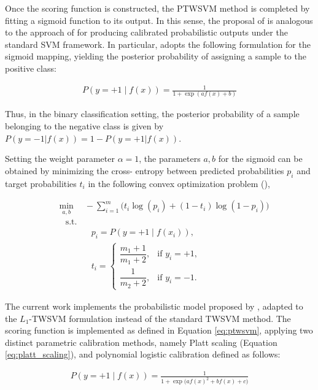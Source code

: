 \documentclass[12pt]{report} %
\begin{document}
\newpage

Once the scoring function is constructed, the PTWSVM method is completed by fitting a sigmoid function to its output. In this sense, the proposal of \cite{shao2012probabilistic} is analogous to the approach of \cite{platt1999probabilistic} for producing calibrated probabilistic outputs under the standard SVM framework. In particular, \cite{shao2012probabilistic} adopts the following formulation for the sigmoid mapping, yielding the posterior probability of assigning a sample to the positive class:

\begin{align}
\label{eq:platt_scaling}
P(y = +1 \mid f(x)) = \frac{1}{1 + \exp(af(x) + b)}
\end{align}

Thus, in the binary classification setting, the posterior probability of a sample belonging to the negative class is given by $P(y = -1| f(x)) = 1 - P(y = +1 | f(x))$.

Setting the weight parameter $\alpha = 1$, the parameters $a, b$ for the sigmoid can be obtained by minimizing the cross- entropy between predicted probabilities $p_i$ and  target probabilities $t_i$ in the following convex optimization problem (\cite{shao2012probabilistic}),


\begin{align}
\label{eq:cross_entropy}
& \min_{a,b} \quad - \sum_{i=1}^m \Big( t_i \log(p_i) + (1-t_i) \log(1-p_i) \Big) \\
& \quad \text{s.t.} \nonumber\\
& \quad \quad \quad \quad p_i = P(y = +1 \mid f(x_i)), \nonumber\\
& \quad \quad \quad \quad t_i = 
    \begin{cases} 
        \dfrac{m_1 + 1}{m_1 + 2}, & \text{if } y_i = +1,\\[1em]
        \dfrac{1}{m_2 + 2}, & \text{if } y_i = -1.
    \nonumber \end{cases}
\end{align}

The current work implements the probabilistic model proposed by \cite{shao2012probabilistic}, adapted to the $L_1$-TWSVM formulation instead of the standard TWSVM method. The scoring function is implemented as defined in Equation \ref{eq:ptwsvm}, applying two distinct parametric calibration methods, namely Platt scaling (Equation \ref{eq:platt_scaling}), and polynomial logistic calibration defined as follows:

\begin{align}
\label{eq:polynomial_logistic}
P(y = +1 \mid f(x)) = \frac{1}{1 + \exp\big(a f(x)^{2} + b f(x) + c\big)}
\end{align}
\end{document}
